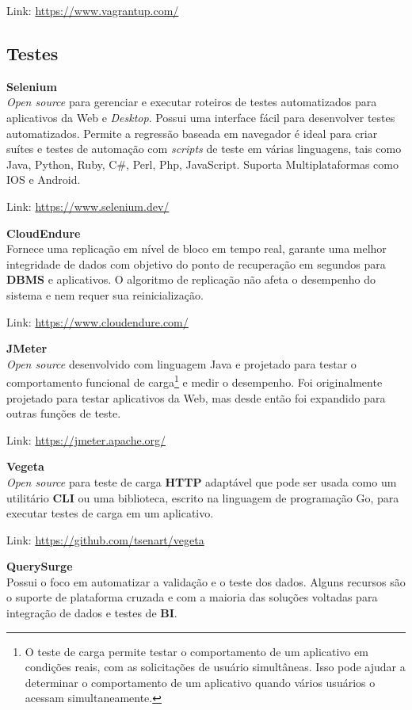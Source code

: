 \documentclass[fleqn,10pt]{../sty/SelfArx} %
\begin{document}
Link: \url{https://www.vagrantup.com/}

\subsection*{Testes}

\textbf{Selenium} \\
\textit{Open source} para gerenciar e executar roteiros de testes automatizados para aplicativos da Web e \textit{Desktop}. Possui uma interface fácil para desenvolver testes automatizados. Permite a regressão baseada em navegador é ideal para criar suítes e testes de automação com \textit{scripts} de teste em várias linguagens, tais como Java, Python, Ruby, C\#, Perl, Php, JavaScript. Suporta Multiplataformas como IOS e Android.

Link: \url{https://www.selenium.dev/}

\textbf{CloudEndure} \\
Fornece uma replicação em nível de bloco em tempo real, garante uma melhor integridade de dados com objetivo do ponto de recuperação em segundos para \textbf{DBMS} e aplicativos. O algoritmo de replicação não afeta o desempenho do sistema e nem requer sua reinicialização.

Link: \url{https://www.cloudendure.com/}

\textbf{JMeter} \\
\textit{Open source} desenvolvido com linguagem Java e projetado para testar o comportamento funcional de carga\footnote{O teste de carga permite testar o comportamento de um aplicativo em condições reais, com as solicitações de usuário simultâneas. Isso pode ajudar a determinar o comportamento de um aplicativo quando vários usuários o acessam simultaneamente.} e medir o desempenho. Foi originalmente projetado para testar aplicativos da Web, mas desde então foi expandido para outras funções de teste.

Link: \url{https://jmeter.apache.org/}

\textbf{Vegeta} \\
\textit{Open source} para teste de carga \textbf{HTTP} adaptável que pode ser usada como um utilitário \textbf{CLI} ou uma biblioteca,  escrito na linguagem de programação Go, para executar testes de carga em um aplicativo.

Link: \url{https://github.com/tsenart/vegeta}

\textbf{QuerySurge} \\
Possui o foco em automatizar a validação e o teste dos dados. Alguns recursos são o suporte de plataforma cruzada e com a maioria das soluções voltadas para integração de dados e testes de \textbf{BI}.
\end{document}
